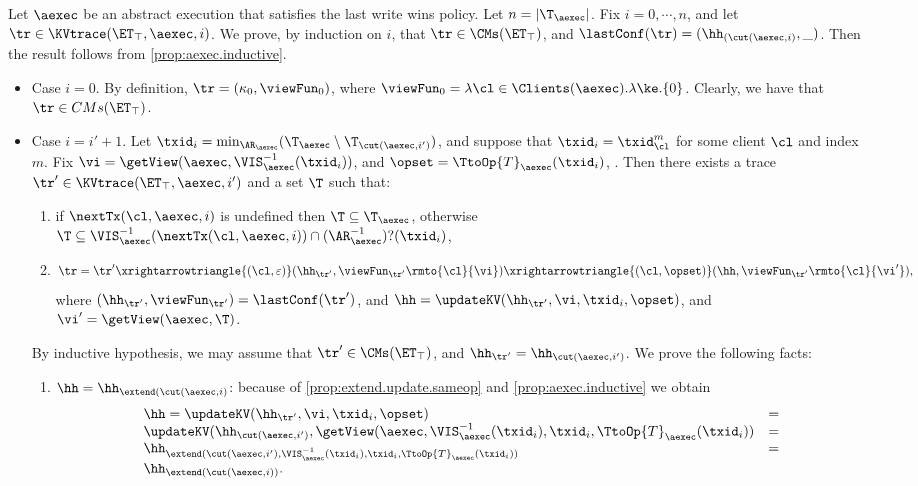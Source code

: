 Let $\aexec$ be an abstract execution that satisfies the last write wins policy. 
Let $n = \lvert \T_{\aexec} \rvert$. Fix $i =0,\cdots, n$, 
and let $\tr \in \KVtrace(\ET_{\top}, \aexec, i)$. We prove, by 
induction on $i$, that $\tr \in \CMs(\ET_{\top})$, and 
$\lastConf(\tr) = (\hh_{(\cut(\aexec, i)}, \_)$. 
Then the result follows from  \cref{prop:aexec.inductive}.

\begin{itemize}
\item Case $i = 0$. By definition, $\tr = (\kappa_{0}, \viewFun_{0})$, 
where $\viewFun_{0} = \lambda \cl \in \Clients(\aexec). \lambda \ke.\{0\}$. 
Clearly, we have that $\tr \in CMs(\ET_{\top})$. 
\item Case $i = i'+1$. Let $\txid_{i} = \min_{\AR_{\aexec}}(\T_{\aexec} \setminus \T_{\cut(\aexec, i')})$, 
and suppose that $\txid_{i} = \txid_{\cl}^{m}$ for some client $\cl$ and index $m$. 
Fix $\vi = \getView(\aexec, \VIS_{\aexec}^{-1}(\txid_{i}))$, and  $\opset = \TtoOp{T}_{\aexec}(\txid_{i})$, . 
Then there exists a trace $\tr' \in \KVtrace(\ET_{\top}, \aexec, i')$ and a set 
$\T$ such that: 
\begin{enumerate}
\item if $\nextTx(\cl, \aexec, i)$ is undefined then $\T \subseteq \T_{\aexec}$, otherwise 
$\T \subseteq \VIS^{-1}_{\aexec}(\nextTx(\cl, \aexec, i)) \cap (\AR_{\aexec}^{-1})?(\txid_{i})$, 
\item
\[
\tr = \tr' \xrightarrowtriangle{(\cl, \varepsilon)} (\hh_{\tr'}, \viewFun_{\tr'}\rmto{\cl}{\vi}) \xrightarrowtriangle{(\cl, \opset)} 
(\hh,  \viewFun_{\tr'}\rmto{\cl}{\vi'}),
\]
where $(\hh_{\tr'}, \viewFun_{\tr'}) = \lastConf(\tr')$, and $\hh = \updateKV(\hh_{\tr'}, \vi, \txid_{i}, \opset)$, 
and $\vi' = \getView(\aexec, \T)$.
\end{enumerate}
By inductive hypothesis, we may assume that $\tr' \in \CMs(\ET_{\top})$, and $\hh_{\tr'} = \hh_{\cut(\aexec, i')}$. 
We prove the following facts: 
\begin{enumerate}
\item $\hh = \hh_{\extend(\cut(\aexec, i)}$: because of 
\ref{prop:extend.update.sameop} and \cref{prop:aexec.inductive} 
we obtain 
\[
\begin{array}{lr}
\hh = \updateKV(\hh_{\tr'}, \vi, \txid_{i}, \opset) &=\\ 
\updateKV(\hh_{\cut(\aexec, i')}, \getView(\aexec, \VIS^{-1}_{\aexec}(\txid_{i}), \txid_{i}, \TtoOp{T}_{\aexec}(\txid_{i})) &=\\
\hh_{\extend(\cut(\aexec, i'), \VIS^{-1}_{\aexec}(\txid_{i}), \txid_{i}, \TtoOp{T}_{\aexec}(\txid_{i})) }&=\\
\hh_{\extend(\cut(\aexec, i))}.
\end{array}
\]


\end{enumerate}
\end{itemize}
